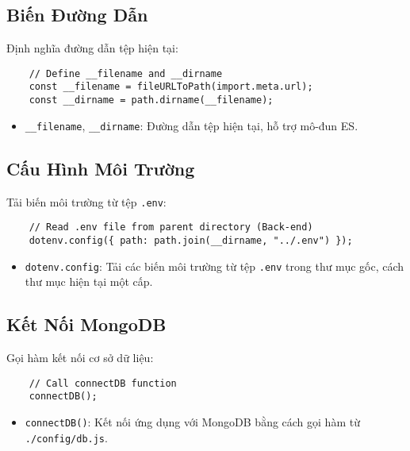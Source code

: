         \subsection{Biến Đường Dẫn}
            \hspace*{0.6cm}Định nghĩa đường dẫn tệp hiện tại:
            \begin{lstlisting}
    // Define __filename and __dirname
    const __filename = fileURLToPath(import.meta.url);
    const __dirname = path.dirname(__filename);
            \end{lstlisting}
            \begin{itemize}
                \item \texttt{\_\_filename}, \texttt{\_\_dirname}: Đường dẫn tệp hiện tại, hỗ trợ mô-đun ES.
            \end{itemize}

        \subsection{Cấu Hình Môi Trường}
            \hspace*{0.6cm}Tải biến môi trường từ tệp \texttt{.env}:
            \begin{lstlisting}
    // Read .env file from parent directory (Back-end)
    dotenv.config({ path: path.join(__dirname, "../.env") });
            \end{lstlisting}
            \begin{itemize}
                \item \texttt{dotenv.config}: Tải các biến môi trường từ tệp \texttt{.env} trong thư mục gốc, cách thư mục hiện tại một cấp.
            \end{itemize}

        \subsection{Kết Nối MongoDB}
            \hspace*{0.6cm}Gọi hàm kết nối cơ sở dữ liệu:
            \begin{lstlisting}
    // Call connectDB function
    connectDB();
            \end{lstlisting}
            \begin{itemize}
                \item \texttt{connectDB()}: Kết nối ứng dụng với MongoDB bằng cách gọi hàm từ \texttt{./config/db.js}.
            \end{itemize}

